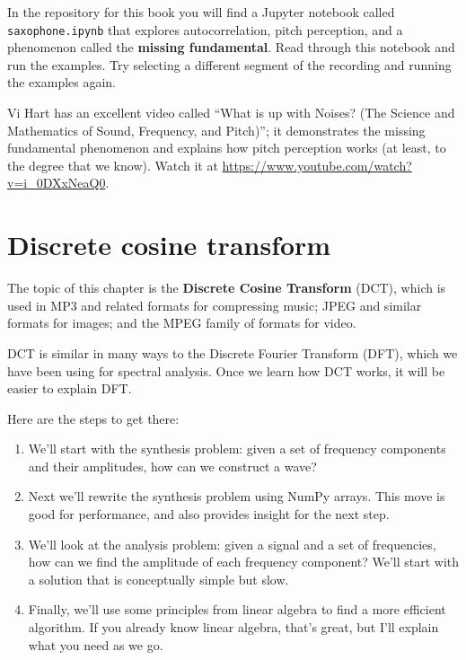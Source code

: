 \documentclass[12pt]{book}
\begin{document}
\begin{exercise}
In the repository for this book you will find a Jupyter notebook
called \verb"saxophone.ipynb" that explores autocorrelation,
pitch perception, and a phenomenon called the {\bf missing fundamental}.
Read through this notebook and run the examples.  Try selecting
a different segment of the recording and running the examples again.

Vi Hart has an excellent video called ``What is up with Noises? (The
Science and Mathematics of Sound, Frequency, and Pitch)''; it
demonstrates the missing fundamental phenomenon and explains how pitch
perception works (at least, to the degree that we know).  Watch it at
\url{https://www.youtube.com/watch?v=i_0DXxNeaQ0}.



\end{exercise}



\chapter{Discrete cosine transform}
\label{dct}

The topic of this chapter is the {\bf Discrete Cosine
  Transform} (DCT), which is used in MP3 and related formats for
compressing music; JPEG and similar formats for images; and the MPEG
family of formats for video.

DCT is similar in many ways to the Discrete Fourier Transform (DFT),
which we have been using for spectral analysis.
Once we learn how DCT works, it will be easier to explain DFT.

Here are the steps to get there:

\begin{enumerate}

\item We'll start with the synthesis problem: given a set of frequency
  components and their amplitudes, how can we construct a wave?

\item Next we'll rewrite the synthesis problem using NumPy arrays.
  This move is good for performance, and also provides insight
  for the next step.

\item We'll look at the analysis problem: given a signal and a
  set of frequencies, how can we find the amplitude of each frequency
  component?  We'll start with a solution that is conceptually simple
  but slow.

\item Finally, we'll use some principles from linear algebra to find a
  more efficient algorithm.  If you already know linear algebra,
  that's great, but I'll explain what you need as we go.

\end{enumerate}
\end{document}
